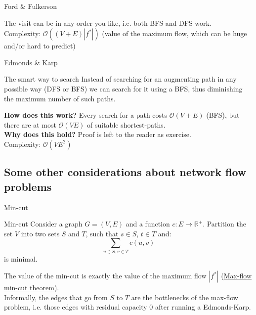 \documentclass{beamer}
\begin{document}
    \begin{frame}{Ford \& Fulkerson}
        \begin{Large}
        The visit can be in any order you like, i.e. both BFS and DFS work. \vspace{24pt}\\
        \alert{Complexity:} $\mathcal{O}((V+E)|f^*|)$ (value of the maximum flow,
                which can be huge and/or hard to predict)
        \end{Large}
    \end{frame}

    \begin{frame}{Edmonds \& Karp}
        \begin{alertblock}{The smart way to search}
            Instead of searching for an augmenting path in any possible way (DFS or BFS)
            we can search for it using a BFS, thus diminishing the maximum number of such
            paths.
        \end{alertblock}
        \textbf{How does this work?} Every search for a path costs $\mathcal{O}(V+E)$ (BFS),
        but there are at most $\mathcal{O}(VE)$ of suitable shortest-paths.
        \\
        \textbf{Why does this hold?} Proof is left to the reader as exercise.
        \vspace{12pt}\\
        \alert{Complexity:} $\mathcal{O}(VE^2)$
    \end{frame}


    \subsection{Some other considerations about network flow problems}
    \begin{frame}{Min-cut}
        \begin{block}{Min-cut}
            Consider a graph $G=(V,E)$ and a function $c:E\rightarrow \mathbb{R}^+$.
            Partition the set $V$ into two sets $S$ and $T$, such that $s\in S$, $t\in T$ and:
            $$\sum_{u\in S, v\in T} c(u,v)$$
            is minimal.
        \end{block}
        \pause
        The value of the min-cut is exactly the value of the maximum flow $|f^*|$ 
        (\href{https://en.wikipedia.org/wiki/Max-flow_min-cut_theorem}{\underline{Max-flow min-cut theorem}}).
        \vspace{12pt}\\
        Informally, the edges that go from $S$ to $T$ are the bottlenecks of the max-flow problem,
        i.e. those edges with residual capacity 0 after running a Edmonds-Karp.
    \end{frame}
\end{document}
